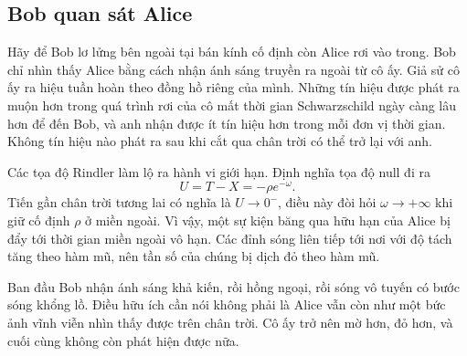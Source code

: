 \begin{classroomqa}
\end{classroomqa}

\begin{classroomqa}
\end{classroomqa}

\subsection{Bob quan sát Alice}

Hãy để Bob lơ lửng bên ngoài tại bán kính cố định còn Alice rơi vào trong. Bob chỉ nhìn thấy Alice bằng cách nhận ánh sáng truyền ra ngoài từ cô ấy. Giả sử cô ấy ra hiệu tuần hoàn theo đồng hồ riêng của mình. Những tín hiệu được phát ra muộn hơn trong quá trình rơi của cô mất thời gian Schwarzschild ngày càng lâu hơn để đến Bob, và anh nhận được ít tín hiệu hơn trong mỗi đơn vị thời gian. Không tín hiệu nào phát ra sau khi cắt qua chân trời có thể trở lại với anh.

Các tọa độ Rindler làm lộ ra hành vi giới hạn. Định nghĩa tọa độ null đi ra
\begin{equation}
U=T-X=-\rho e^{-\omega}.
\end{equation}
Tiến gần chân trời tương lai có nghĩa là \(U\to0^{-}\), điều này đòi hỏi \(\omega\to+\infty\) khi giữ cố định \(\rho\) ở miền ngoài. Vì vậy, một sự kiện băng qua hữu hạn của Alice bị đẩy tới thời gian miền ngoài vô hạn. Các đỉnh sóng liên tiếp tới nơi với độ tách tăng theo hàm mũ, nên tần số của chúng bị dịch đỏ theo hàm mũ.

Ban đầu Bob nhận ánh sáng khả kiến, rồi hồng ngoại, rồi sóng vô tuyến có bước sóng khổng lồ. Điều hữu ích cần nói không phải là Alice vẫn còn như một bức ảnh vĩnh viễn nhìn thấy được trên chân trời. Cô ấy trở nên mờ hơn, đỏ hơn, và cuối cùng không còn phát hiện được nữa.

